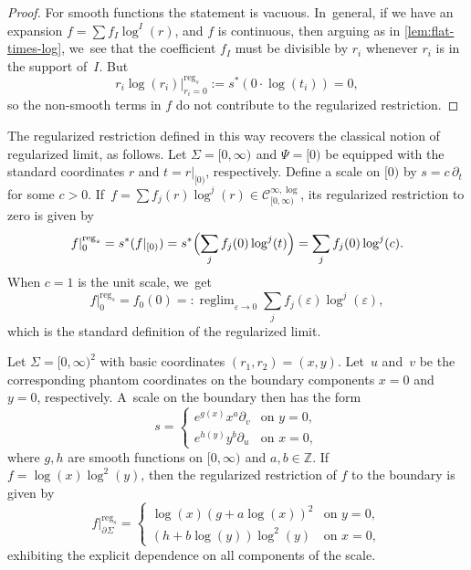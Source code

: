 \documentclass[10pt]{amsart}
\newcommand{\rBrac}[1]{\Bigl(#1\Bigr)}
\theoremstyle{definition}
\theoremstyle{remark}
\newenvironment{example}
  {\pushQED{\qed}\renewcommand{\qedsymbol}{$\lozenge$}\examplex}
  {\popQED\endexamplex}
\newcommand{\ZZ}{\mathbb{Z}}
\newcommand{\halfspc}[1]{[0,\infty)^{#1}}
\let\epsilon\varepsilon
\newcommand{\Cinflog}[1]{\mathscr{C}^{\infty,\log}_{#1}}
\newcommand{\cvf}[1]{\partial_{#1}}
\newcommand{\reg}[1][]{\mathrm{reg}_{#1}}
\DeclareMathOperator{\reglim}{reglim}
\newcommand{\Sig}{\Sigma}
\newcommand{\bdSig}[1][]{\partial^{#1}\Sigma}
\begin{document}
\begin{proof}
For smooth functions the statement is vacuous. In~general, if we have an expansion $f = \sum f_I\log^I(r)$, and $f$ is continuous, then arguing as in \autoref{lem:flat-times-log}, we~see that the coefficient $f_I$ must be divisible by $r_i$ whenever $r_i$ is in the support of~$I$. But\vspace*{-3pt}
\[
r_i\log(r_i)|^{\reg[s]}_{r_i=0} := s^*(0 \cdot \log(t_i)) = 0,
\]
so the non-smooth terms in $f$ do not contribute to the regularized restriction.
\end{proof}

The regularized restriction defined in this way recovers the classical notion of regularized limit, as follows.
\begin{example}
Let $\Sig = \halfspc{}$ and $\Psi = [0)$ be equipped with the standard coordinates $r$ and $t = r|_{[0)}$, respectively. Define a scale on $[0)$ by $s = c \,\cvf{t}$ for some $c>0$. If~$f = \sum f_j(r)\log^j(r) \in \Cinflog{\halfspc{}}$, its regularized restriction to zero is given by\vspace*{-3pt}
\[
f|^{\reg[s]}_0 = s^*(f|_{[0)}) = s^*\rBrac{\sum_j f_j(0)\log^j(t)} = \sum_j f_j(0)\log^j(c).
\]
When $c= 1$ is the unit scale, we~get\vspace*{-3pt}
\[
f|^{\reg[s]}_0 = f_0(0) =: \reglim_{\epsilon \to 0} \sum_j f_j(\epsilon)\log^j(\epsilon),
\]
which is the standard definition of the regularized limit.
\end{example}

\begin{example}
Let $\Sig = \halfspc{2}$ with basic coordinates $(r_1,r_2)=(x,y)$. Let~$u$ and~$v$ be the corresponding phantom coordinates on the boundary components $x=0$ and $y=0$, respectively. A~scale on the boundary then has the form\vspace*{-3pt}
\[
s =
\begin{cases}
e^{g(x)} x^a \cvf{v} & \textrm{on } y=0, \\
e^{h(y)} y^b \cvf{u} &\textrm{on } x=0,
\end{cases}
\]
where $g,h$ are smooth functions on $\halfspc{}$ and $a,b \in \ZZ$. If~$f = \log(x)\log^2(y)$, then the regularized restriction of $f$ to the boundary is given by\vspace*{-3pt}
\[
f|^{\reg[s]}_{\bdSig} = \begin{cases}
\log(x)(g+a\log(x))^2 &\textrm{on }y=0, \\
(h+b\log(y))\log^2(y) & \textrm{on } x=0,
\end{cases}
\]
exhibiting the explicit dependence on all components of the scale.
\end{example}
\end{document}
